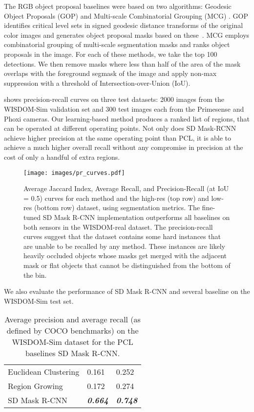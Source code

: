 \documentclass[letterpaper, 10 pt, conference]{ieeeconf}  \pdfoutput=1
\numberwithin{equation}{section}
\begin{document}
The RGB object proposal baselines were based on two algorithms: Geodesic Object Proposals (GOP) \cite{krahenbuhl2014geodesic} and Multi-scale Combinatorial Grouping (MCG) \cite{arbelaez2014multiscale}. GOP identifies critical level sets in signed geodesic distance transforms of the original color images and generates object proposal masks based on these~\cite{krahenbuhl2014geodesic}. MCG employs combinatorial grouping of multi-scale segmentation masks and ranks object proposals in the image. For each of these methods, we take the top 100 detections. We then remove masks where less than half of the area of the mask overlaps with the foreground segmask of the image and apply non-max suppression with a threshold of  Intersection-over-Union (IoU).


 shows precision-recall curves on three test datasets: 2000 images from the WISDOM-Sim validation set and 300 test images each from the Primesense and Phoxi cameras. Our learning-based method produces a ranked list of regions, that can be operated at different operating points.
Not only does SD Mask-RCNN achieve higher precision at the same operating point than PCL, it is able to achieve a much higher overall recall without any compromise in precision at the cost of only a handful of extra regions. 

\begin{figure*}[t!]
    \centering
    \texttt{[image: images/pr\_curves.pdf]}
    \caption{Average Jaccard Index, Average Recall, and Precision-Recall (at IoU = 0.5) curves for each method and the high-res (top row) and low-res (bottom row) dataset, using segmentation metrics. The fine-tuned SD Mask R-CNN implementation outperforms all baselines on both sensors in the WISDOM-real dataset. The precision-recall curves suggest that the dataset contains some hard instances that are unable to be recalled by any method. These instances are likely heavily occluded objects whose masks get merged with the adjacent mask or flat objects that cannot be distinguished from the bottom of the bin.}
\end{figure*}

We also evaluate the performance of SD Mask R-CNN and several baseline on the WISDOM-Sim test set.

\begin{table}[t!]
    \setlength\tabcolsep{4pt}
    \begin{tabularx}{\linewidth}{*{1}{l}*{2}{Z}}
        \toprule
          &  &  \\\midrule
        Euclidean Clustering    & 0.161 & 0.252 \\
        Region Growing          & 0.172 & 0.274 \\
        SD Mask R-CNN           & \textit{\textbf{0.664}} & \textit{\textbf{0.748}} \\
        \bottomrule
    \end{tabularx}
    \caption{Average precision and average recall (as defined by COCO benchmarks) on the WISDOM-Sim dataset for the PCL baselines SD Mask R-CNN.}
    \label{tab:ap_sim}
\end{table}
\end{document}
